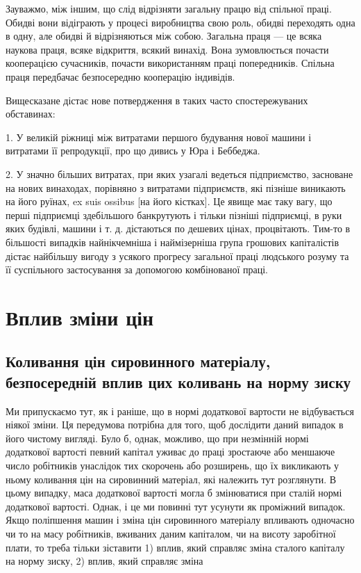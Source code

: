 Зауважмо, між іншим, що слід відрізняти загальну працю від
спільної праці. Обидві вони відіграють у процесі виробництва
свою роль, обидві переходять одна в одну, але обидві й
відрізняються між собою. Загальна праця — це всяка наукова
праця, всяке відкриття, всякий винахід. Вона зумовлюється почасти кооперацією сучасників, почасти
використанням праці попередників. Спільна праця передбачає безпосередню кооперацію індивідів.

Вищесказане дістає нове потвердження в таких часто спостережуваних обставинах:

1. У великій ріжниці між витратами першого будування нової
машини і витратами її репродукції, про що дивись у Юра
і Беббеджа.

2. У значно більших витратах, при яких узагалі ведеться підприємство, засноване на нових винаходах,
порівняно з витратами
підприємств, які пізніше виникають на його руїнах, ex suis ossibus
[на його кістках]. Це явище має таку вагу, що перші
підприємці здебільшого банкрутують і тільки пізніші підприємці,
в руки яких будівлі, машини і т. д. дістаються по дешевих цінах, процвітають. Тим-то в більшості
випадків найнікчемніша
і наймізерніша група грошових капіталістів дістає найбільшу
вигоду з усякого прогресу загальної праці людського розуму та
її суспільного застосування за допомогою комбінованої праці.

\section{Вплив зміни цін}

\subsection{Коливання цін сировинного матеріалу, безпосередній вплив цих коливань на норму зиску}

Ми припускаємо тут, як і раніше, що в нормі додаткової
вартости не відбувається ніякої зміни. Ця передумова потрібна
для того, щоб дослідити даний випадок в його чистому вигляді.
Було б, однак, можливо, що при незмінній нормі додаткової вартості певний капітал уживає до праці
зростаюче або меншаюче число робітників унаслідок тих скорочень або розширень, що їх викликають у
ньому коливання цін на сировинний матеріал, які належить тут розглянути. В цьому випадку,
маса додаткової вартості могла б змінюватися при сталій нормі
додаткової вартості. Однак, і це ми повинні тут усунути
як проміжний випадок. Якщо поліпшення машин і зміна цін
сировинного матеріалу впливають одночасно чи то на масу
робітників, вживаних даним капіталом, чи на висоту заробітної
плати, то треба тільки зіставити 1) вплив, який справляє зміна
сталого капіталу на норму зиску, 2) вплив, який справляє зміна
\parbreak{}  %
